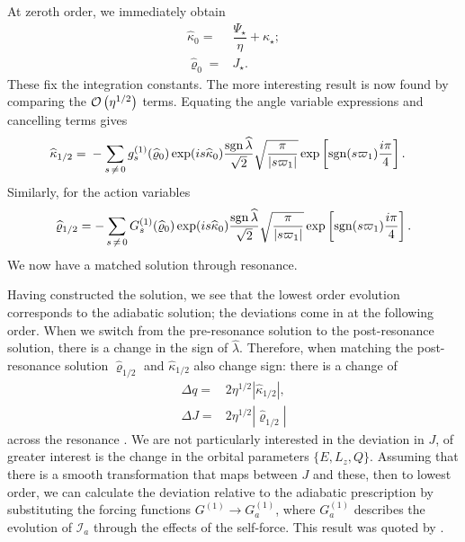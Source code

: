 At zeroth order, we immediately obtain
\begin{align}
\widehat{\kappa}_0 = {} & \dfrac{\Psi_\star}{\eta} + \kappa_\star; \\
\widehat{\varrho}_0 = {} & J_\star.
\end{align}
These fix the integration constants. The more interesting result is now found by comparing the $\mathcal{O}\left({\eta^{1/2}}\right)$ terms. Equating the angle variable expressions and cancelling terms gives
\begin{align}
\widehat{\kappa}_{1/2} = {} & -\sum_{s\,\neq\,0}g_s^{(1)}(\widehat{\varrho}_0)\exp(is \widehat{\kappa}_0)\dfrac{\operatorname{sgn} \widehat{\lambda}}{\sqrt{2}}\sqrt{\dfrac{\pi}{|s\varpi_1|}}\exp\left[\operatorname{sgn}(s\varpi_1)\dfrac{i\pi}{4}\right].
\end{align}
Similarly, for the action variables
\begin{equation}
\widehat{\varrho}_{1/2} = -\sum_{s\,\neq\,0}G_s^{(1)}(\widehat{\varrho}_0)\exp(is \widehat{\kappa}_0)\dfrac{\operatorname{sgn} \widehat{\lambda}}{\sqrt{2}}\sqrt{\dfrac{\pi}{|s\varpi_1|}}\exp\left[\operatorname{sgn}(s\varpi_1)\dfrac{i\pi}{4}\right].
\label{eq:J-1/2}
\end{equation}
We now have a matched solution through resonance.

Having constructed the solution, we see that the lowest order evolution corresponds to the adiabatic solution; the deviations come in at the following order. When we switch from the pre-resonance solution to the post-resonance solution, there is a change in the sign of $\widehat{\lambda}$. Therefore, when matching the post-resonance solution $\widehat{\varrho}_{1/2}$ and $\widehat{\kappa}_{1/2}$ also change sign: there is a change of
\begin{align}
\Delta q = {} & 2 \eta^{1/2}\left|\widehat{\kappa}_{1/2}\right|, \\
\Delta J = {} & 2 \eta^{1/2}\left|\widehat{\varrho}_{1/2}\right|
\label{eq:jumps}
\end{align}
across the resonance \citep{Kevorkian1987}. We are not particularly interested in the deviation in $J$, of greater interest is the change in the orbital parameters $\{E,L_z,Q\}$. Assuming that there is a smooth transformation that maps between $J$ and these, then to lowest order, we can calculate the deviation relative to the adiabatic prescription by substituting the forcing functions $G^{(1)} \rightarrow G_a^{(1)}$, where $G_a^{(1)}$ describes the evolution of $\mathcal{I}_a$ through the effects of the self-force. This result was quoted by \citet{Flanagan2012}.

